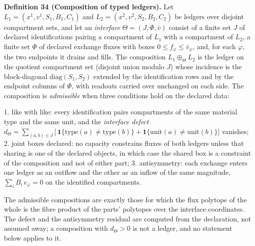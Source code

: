 \documentclass[11pt]{article}
\begin{document}
\textbf{Definition 34 (Composition of typed ledgers).} Let \(L_1 = (x^1, v^1, S_1, B_1, C_1)\) and
\(L_2 = (x^2, v^2, S_2, B_2, C_2)\) be ledgers over disjoint compartment sets, and let an \emph{interface}
\(\Theta = (J, \Phi, \bar v)\) consist of a finite set \(J\) of declared identifications pairing a
compartment of \(L_1\) with a compartment of \(L_2\), a finite set \(\Phi\) of declared exchange fluxes
with boxes \(0 \le f_\varphi \le \bar v_\varphi\), and, for each \(\varphi\), the two endpoints it drains
and fills. The composition \(L_1 \oplus_\Theta L_2\) is the ledger on the quotient compartment set
(disjoint union modulo \(J\)) whose incidence is the block-diagonal \(\mathrm{diag}(S_1, S_2)\) extended
by the identification rows and by the endpoint columns of \(\Phi\), with readouts carried over unchanged
on each side. The composition is \emph{admissible} when three conditions hold on the declared data:

1. like with like: every identification pairs compartments of the same material type and the same
   unit, and the \emph{interface defect}
   \(d_\Theta = \sum_{(a,b) \in J} \bigl[\,\mathbf 1\{\mathrm{type}(a) \ne \mathrm{type}(b)\} + \mathbf 1\{\mathrm{unit}(a) \ne \mathrm{unit}(b)\}\bigr]\) vanishes;
2. joint boxes declared: no capacity constrains fluxes of both ledgers unless that sharing is one of
   the declared objects, in which case the shared box is a constraint of the composition and not of
   either part;
3. antisymmetry: each exchange enters one ledger as an outflow and the other as an inflow of the same
   magnitude, \(\textstyle\sum_{i} B_i\, e_\varphi = 0\) on the identified compartments.

The admissible compositions are exactly those for which the flux polytope of the whole is the fibre
product of the parts' polytopes over the interface coordinates. The defect and the antisymmetry
residual are computed from the declaration, not assumed away; a composition with \(d_\Theta > 0\) is not
a ledger, and no statement below applies to it.
\end{document}
